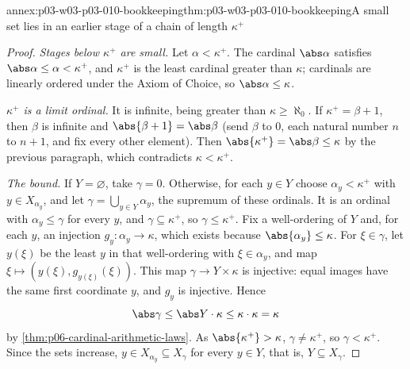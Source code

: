 \begin{annexitem}{annex:p03-w03-p03-010-bookkeeping}{thm:p03-w03-p03-010-bookkeeping}{A small set lies in an earlier stage of a chain of length \(\kappa^+\)}
\begin{proof}
\emph{Stages below \(\kappa^+\) are small.}  Let \(\alpha<\kappa^+\).  The
cardinal \(\abs\alpha\) satisfies \(\abs\alpha\leq\alpha<\kappa^+\), and
\(\kappa^+\) is the least cardinal greater than \(\kappa\); cardinals are
linearly ordered under the Axiom of Choice, so \(\abs\alpha\leq\kappa\).

\emph{\(\kappa^+\) is a limit ordinal.}  It is infinite, being greater than
\(\kappa\geq\aleph_0\).  If \(\kappa^+=\beta+1\), then \(\beta\) is
infinite and \(\abs{\beta+1}=\abs\beta\) (send \(\beta\) to \(0\), each
natural number \(n\) to \(n+1\), and fix every other element).  Then
\(\abs{\kappa^+}=\abs\beta\leq\kappa\) by the previous paragraph, which
contradicts \(\kappa<\kappa^+\).

\emph{The bound.}  If \(Y=\varnothing\), take \(\gamma=0\).  Otherwise,
for each \(y\in Y\) choose \(\alpha_y<\kappa^+\) with
\(y\in X_{\alpha_y}\), and let
\(\gamma=\bigcup_{y\in Y}\alpha_y\), the supremum of these ordinals.  It is
an ordinal with \(\alpha_y\leq\gamma\) for every \(y\), and
\(\gamma\subseteq\kappa^+\), so \(\gamma\leq\kappa^+\).  Fix a well-ordering
of \(Y\) and, for each \(y\), an injection \(g_y:\alpha_y\to\kappa\), which
exists because \(\abs{\alpha_y}\leq\kappa\).  For \(\xi\in\gamma\), let
\(y(\xi)\) be the least \(y\) in that well-ordering with
\(\xi\in\alpha_y\), and map \(\xi\mapsto(y(\xi),g_{y(\xi)}(\xi))\).  This
map \(\gamma\to Y\times\kappa\) is injective: equal images have the same
first coordinate \(y\), and \(g_y\) is injective.  Hence
\[
  \abs\gamma\leq\abs Y\cdot\kappa\leq\kappa\cdot\kappa=\kappa
\]
by \cref{thm:p06-cardinal-arithmetic-laws}.  As
\(\abs{\kappa^+}>\kappa\), \(\gamma\ne\kappa^+\), so \(\gamma<\kappa^+\).
Since the sets increase, \(y\in X_{\alpha_y}\subseteq X_\gamma\) for
every \(y\in Y\), that is, \(Y\subseteq X_\gamma\).
\end{proof}
\end{annexitem}

